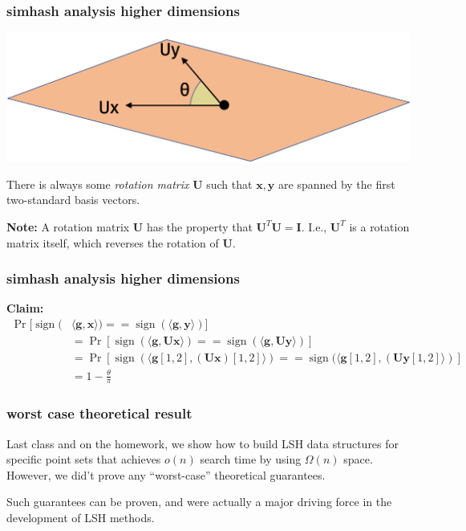 \documentclass[compress]{beamer}
\newcommand{\bv}[1]{\mathbf{#1}}
\DeclareMathOperator{\sign}{sign}
\begin{document}
\begin{frame}
	\frametitle{simhash analysis higher dimensions}
	\begin{center}
		\includegraphics[width=.7\textwidth]{high_dim2.png}
	\end{center}
	There is always some \emph{rotation matrix} $\bv{U}$ such that $\bv{x},\bv{y}$ are spanned by the first two-standard basis vectors. 
	
	
	\textbf{Note:} A rotation matrix $\bv{U}$ has the property that $\bv{U}^T\bv{U} = \bv{I}$. I.e., $\bv{U}^T$ is a rotation matrix itself, which reverses the rotation of $\bv{U}$.
\end{frame}

\begin{frame}[t]
	\frametitle{simhash analysis higher dimensions}
\textbf{Claim:} 
\begin{align*}
	\Pr[\sign(&\langle \bv{g}, \bv{x} \rangle) == \sign(\langle \bv{g}, \bv{y} \rangle)] \\
	&= \Pr[\sign(\langle \bv{g}, \bv{U}\bv{x} \rangle) == \sign(\langle \bv{g}, \bv{U}\bv{y} \rangle)]\\
	&= \Pr[\sign(\langle \bv{g}[1,2], (\bv{U}\bv{x})[1,2] \rangle) == \sign(\langle \bv{g}[1,2], (\bv{U}\bv{y}[1,2] \rangle)] \\
	&= 	1 - \frac{\theta}{\pi}
	\end{align*}
\end{frame}

\begin{frame}
	\frametitle{worst case theoretical result}

	\begin{center}
	Last class and on the homework, we show how to build LSH data structures for specific point sets that achieves $o(n)$ search time by using $\Omega(n)$ space. However, we did't prove any ``worst-case'' theoretical guarantees. 
	\end{center}

	Such guarantees can be proven, and were actually a major driving force in the development of LSH methods.

\end{frame}
\end{document}
